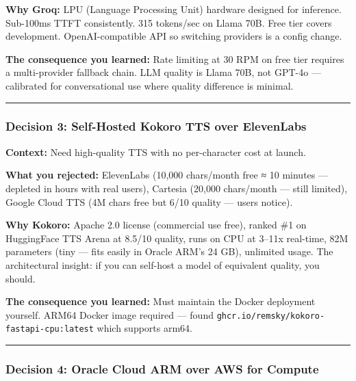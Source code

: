 \documentclass[
  11pt,
]{article}
\newcommand{\passthrough}[1]{#1}
\begin{document}
\textbf{Why Groq:} LPU (Language Processing Unit) hardware designed for
inference. Sub-100ms TTFT consistently. 315 tokens/sec on Llama 70B.
Free tier covers development. OpenAI-compatible API so switching
providers is a config change.

\textbf{The consequence you learned:} Rate limiting at 30 RPM on free
tier requires a multi-provider fallback chain. LLM quality is Llama 70B,
not GPT-4o --- calibrated for conversational use where quality
difference is minimal.

\begin{center}\rule{0.5\linewidth}{0.5pt}\end{center}

\hypertarget{decision-3-self-hosted-kokoro-tts-over-elevenlabs}{%
\subsubsection{Decision 3: Self-Hosted Kokoro TTS over
ElevenLabs}\label{decision-3-self-hosted-kokoro-tts-over-elevenlabs}}

\textbf{Context:} Need high-quality TTS with no per-character cost at
launch.

\textbf{What you rejected:} ElevenLabs (10,000 chars/month free ≈ 10
minutes --- depleted in hours with real users), Cartesia (20,000
chars/month --- still limited), Google Cloud TTS (4M chars free but 6/10
quality --- users notice).

\textbf{Why Kokoro:} Apache 2.0 license (commercial use free), ranked
\#1 on HuggingFace TTS Arena at 8.5/10 quality, runs on CPU at 3--11x
real-time, 82M parameters (tiny --- fits easily in Oracle ARM's 24 GB),
unlimited usage. The architectural insight: if you can self-host a model
of equivalent quality, you should.

\textbf{The consequence you learned:} Must maintain the Docker
deployment yourself. ARM64 Docker image required --- found
\passthrough{\lstinline!ghcr.io/remsky/kokoro-fastapi-cpu:latest!} which
supports arm64.

\begin{center}\rule{0.5\linewidth}{0.5pt}\end{center}

\hypertarget{decision-4-oracle-cloud-arm-over-aws-for-compute}{%
\subsubsection{Decision 4: Oracle Cloud ARM over AWS for
Compute}\label{decision-4-oracle-cloud-arm-over-aws-for-compute}}
\end{document}

